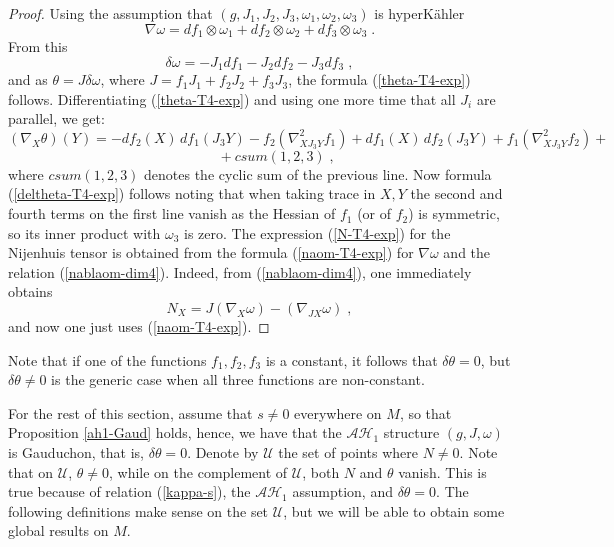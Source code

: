 \documentclass{amsart}
\begin{document}
\begin{proof} Using the assumption that $(g, J_1, J_2, J_3, \omega_1, \omega_2, \omega_3)$ is hyperK\"ahler 
\begin{equation} \label{naom-T4-exp}
    \nabla \omega = df_1 \otimes \omega_1 + df_2 \otimes \omega_2 + df_3 \otimes \omega_3 \; .
\end{equation} 
From this
$$ \delta \omega = -J_1 df_1 - J_2 df_2  -J_3 df_3 \; ,$$
and as $\theta = J \delta \omega$, where $J = f_1 J_1 + f_2 J_2 + f_3 J_3$, the formula (\ref{theta-T4-exp}) follows. 
Differentiating (\ref{theta-T4-exp}) and using one more time that all $J_i$ are parallel, we get:
$$ (\nabla_X \theta)(Y) = - df_2(X) \, df_1(J_3 Y) - f_2 (\nabla^2_{X J_3 Y} f_1) +  df_1(X) \, df_2 (J_3 Y) + f_1 (\nabla^2_{X J_3 Y} f_2) +$$ 
$$ \hspace{1cm} + {csum (1, 2, 3)} \; ,$$
where $csum(1, 2, 3)$ denotes the cyclic sum of the previous line. Now formula (\ref{deltheta-T4-exp}) follows noting that when taking trace in $X,Y$ the second and fourth terms on the first line vanish as the Hessian of $f_1$ (or of $f_2$) is symmetric, so its inner product with $\omega_3$ is zero. The expression (\ref{N-T4-exp}) for the Nijenhuis tensor is obtained from the formula (\ref{naom-T4-exp}) for $\nabla \omega$ and the relation (\ref{nablaom-dim4}). Indeed, from (\ref{nablaom-dim4}), one immediately obtains
$$N_X = J(\nabla_X \omega) - (\nabla_{JX} \omega) \; ,$$
and now one just uses (\ref{naom-T4-exp}).
\end{proof}

Note that if one of the functions $f_1, f_2, f_3$ is a constant, it follows that $\delta \theta = 0$, but $\delta \theta \neq 0$ is the generic case when all three functions are non-constant.

\vspace{0.3cm}

For the rest of this section, assume that $s\neq 0$ everywhere on $M$, so that Proposition \ref{ah1-Gaud} holds, hence, we have that the $\mathcal{AH}_1$ structure $(g, J, \omega)$ is Gauduchon, that is, $\delta \theta = 0$. Denote by $\mathcal{U}$ the set of points where $N\neq 0$. Note that on $\mathcal{U}$, $\theta \neq 0$, while on the complement of $\mathcal{U}$, both $N$ and $\theta$ vanish. This is true because of relation (\ref{kappa-s}), the $\mathcal{AH}_1$ assumption, and $\delta \theta = 0$. The following definitions make sense on the set $\mathcal{U}$, but we will be able to obtain some global results on $M$.
\end{document}
